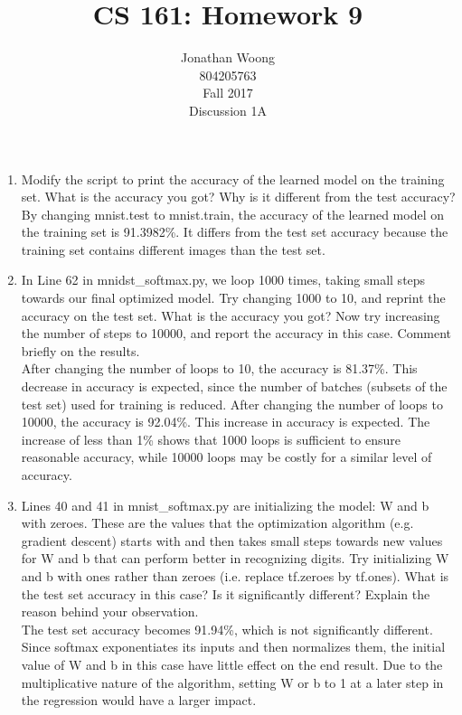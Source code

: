 \documentclass[10.5pt,letterpaper]{article}
\date{\displaydate{date}}
\begin{document}
\title{CS 161: Homework 9}
\author{
	Jonathan Woong\\
	804205763\\
	Fall 2017\\
	Discussion 1A}
\maketitle
\pagebreak


\begin{enumerate}[label=\textbf{Problem \arabic*.}]
\item Modify the script to print the accuracy of the learned model on the training set. What is the accuracy you got? Why is it different from the test accuracy?\\
By changing mnist.test to mnist.train, the accuracy of the learned model on the training set is 91.3982\%. It differs from the test set accuracy because the training set contains different images than the test set.
\item In Line 62 in mnidst\_softmax.py, we loop 1000 times, taking small steps towards our final optimized model. Try changing 1000 to 10, and reprint the accuracy on the test set. What is the accuracy you got? Now try increasing the number of steps to 10000, and report the accuracy in this case. Comment briefly on the results.\\
After changing the number of loops to 10, the accuracy is 81.37\%. This decrease in accuracy is expected, since the number of batches (subsets of the test set) used for training is reduced.
After changing the number of loops to 10000, the accuracy is 92.04\%. This increase in accuracy is expected. The increase of less than 1\% shows that 1000 loops is sufficient to ensure reasonable accuracy, while 10000 loops may be costly for a similar level of accuracy.
\item Lines 40 and 41 in mnist\_softmax.py are initializing the model: W and b with zeroes. These are the values that the optimization algorithm (e.g. gradient descent) starts with and then takes small steps towards new values for W and b that can perform better in recognizing digits. Try initializing W and b with ones rather than zeroes (i.e. replace tf.zeroes by tf.ones). What is the test set accuracy in this case? Is it significantly different? Explain the reason behind your observation.\\
The test set accuracy becomes 91.94\%, which is not significantly different. Since softmax exponentiates its inputs and then normalizes them, the initial value of W and b in this case have little effect on the end result. Due to the multiplicative nature of the algorithm, setting W or b to 1 at a later step in the regression would have a larger impact.
\end{enumerate}
\end{document}
